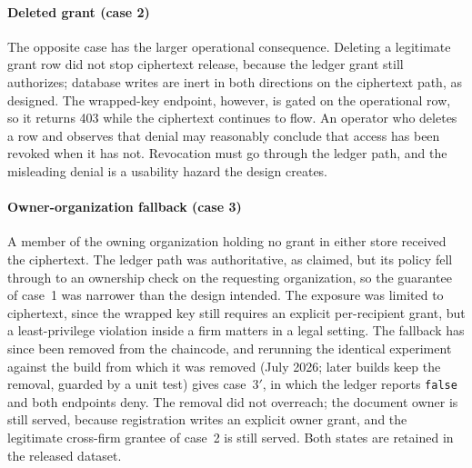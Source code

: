 \documentclass[preprint,12pt]{elsarticle}
\begin{document}
\paragraph{Deleted grant (case 2)}
The opposite case has the larger operational consequence. Deleting a
legitimate grant row did not stop ciphertext release, because the ledger grant
still authorizes; database writes are inert in both directions on the
ciphertext path, as designed. The wrapped-key endpoint, however, is
gated on the operational row, so it returns 403 while the ciphertext continues
to flow. An operator who deletes a row and observes that denial may reasonably
conclude that access has been revoked when it has not. Revocation must go
through the ledger path, and the misleading denial is a usability hazard the design creates.

\paragraph{Owner-organization fallback (case 3)}
A member of the owning organization holding no grant in either store received
the ciphertext. The ledger path was authoritative, as claimed, but its policy
fell through to an ownership check on the requesting organization, so the
guarantee of case~1 was narrower than the design intended. The exposure was
limited to ciphertext, since the wrapped key still requires an explicit
per-recipient grant, but a least-privilege violation inside a firm matters in
a legal setting. The fallback has since been removed from the chaincode, and rerunning
the identical experiment against the build from which it was removed (July
2026; later builds keep the removal, guarded by a unit test) gives
case~3$'$, in which the ledger reports \texttt{false} and both endpoints
deny. The removal did not
overreach; the document owner is still served, because registration writes an
explicit owner grant, and the legitimate cross-firm grantee of case~2 is still
served. Both states are retained in the released dataset.
\end{document}
